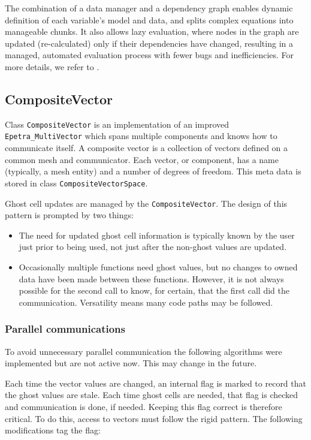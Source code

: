 The combination of a data manager and a dependency graph enables dynamic definition of each variable's model 
and data, and splits complex equations into manageable chunks. 
It also allows lazy evaluation, where nodes in the graph are updated (re-calculated) only if their dependencies
have changed, resulting in a managed, automated evaluation process with fewer bugs and inefficiencies.
For more details, we refer to \cite{coon2016managing}.


\subsection{CompositeVector}
Class {\tt CompositeVector} is an implementation of an improved
{\tt Epetra\_MultiVector} which spans multiple components and knows how to
communicate itself.
A composite vector is a collection of vectors defined on a common mesh and
communicator. 
Each vector, or component, has a name (typically, a mesh entity)
and a number of degrees of freedom.  
This meta data is stored in class {\tt CompositeVectorSpace}.

Ghost cell updates are managed by the {\tt CompositeVector}. 
The design of this pattern is prompted by two things:
\begin{itemize}
\item The need for updated ghost cell information is typically known by the
      user just prior to being used, not just after the non-ghost values are
      updated.
\item Occasionally multiple functions need ghost values, but no changes to
      owned data have been made between these functions.  However, it is not
      always possible for the second call to know, for certain, that the first
      call did the communication.  Versatility means many code paths may be
      followed.
\end{itemize}


\subsubsection{Parallel communications}
To avoid unnecessary parallel communication the following algorithms were implemented
but are not active now.
This may change in the future.

Each time the vector values are changed, an internal flag is marked to
record that the ghost values are stale.
Each time ghost cells are needed, that flag is checked and communication
is done, if needed.
Keeping this flag correct is therefore critical. 
To do this, access to vectors must follow the rigid pattern.
The following modifications tag the flag:

